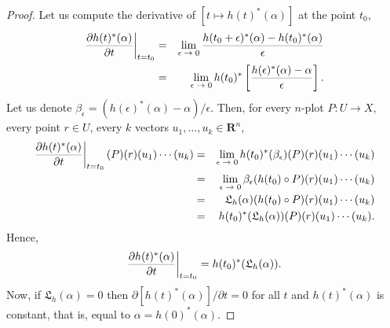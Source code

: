 \documentclass[11pt,reqno]{amsart}
\theoremstyle{definition}
\renewcommand{\over}{\above .2pt}
\newcommand{\RR}{{\mathbf R}}
\def \P{{P}}
\def \U{{U}}
\def \X{{X}}
\newcommand{\fL}{{\mathfrak  L}}
\newcommand{\DLie}{{\fL}}
\begin{document}
  \begin{proof}
    Let us compute the derivative of $[t \mapsto h(t)^*(\alpha)]$ at the point $t_0$, 
    \begin{eqnarray*}
      \left.{\partial h(t)^*(\alpha) \over
      \partial t}\right\vert_{t = t_0}
      & = & \lim_{\mbox{\scriptsize$\epsilon \to 0$}}
      {h(t_0+\epsilon)^*(\alpha) -h(t_0)^*(\alpha)
      \over \epsilon} \\
      &  = & \lim_{\mbox{\scriptsize$\epsilon
        \to 0$}} h(t_0)^*\left[{h(\epsilon)^*(\alpha) -\alpha
      \over \epsilon}\right].
    \end{eqnarray*}    
    Let us denote $\beta_\epsilon = (h(\epsilon)^*(\alpha) -\alpha)/
      \epsilon$. Then, for every $n$-plot $\P: \U \to \X$,
    every point $r \in \U$, every $k$ vectors $u_1, \ldots, u_k \in \RR^n$,
    \begin{eqnarray*}
      \left.{\partial h(t)^*(\alpha) \over \partial
      t}\right\vert_{t = t_0}(\P)(r)(u_1)\cdots(u_k) & = & 
      \lim_{\mbox{\scriptsize$\epsilon \to 0$}}
      h(t_0)^*(\beta_\epsilon)(\P)(r)(u_1)\cdots(u_k) \\
      & = & \lim_{\mbox{\scriptsize$\epsilon \to
      0$}}\beta_\epsilon(h(t_0) \circ \P)(r)(u_1)\cdots(u_k)
      \\
      & = & \DLie_h(\alpha)(h(t_0)
      \circ \P)(r)(u_1)\cdots(u_k) \\
      & = &
      h(t_0)^*(\DLie_h(\alpha))(\P)(r)(u_1)\cdots(u_k).
    \end{eqnarray*} 
    Hence,
    $$
      \left.{\partial h(t)^*(\alpha) \over \partial
      t}\right\vert_{t = t_0} = h(t_0)^*(\DLie_h(\alpha)).
      $$
    Now, if $\DLie_h(\alpha) = 0$ then 
    $\partial[h(t)^*(\alpha)]/\partial t =0$
    for all $t$ and $h(t)^*(\alpha)$ is constant, that is,
    equal to $\alpha = h(0)^*(\alpha)$. 
  \end{proof}
  
\end{document}
